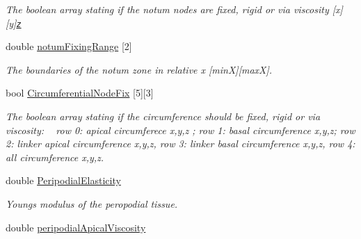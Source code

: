 \begin{DoxyCompactItemize}
\begin{DoxyCompactList}\small\item\em The boolean array stating if the notum nodes are fixed, rigid or via viscosity \mbox{[}x\mbox{]}\mbox{[}y\mbox{]}\href{accompanying boolean array to specify the fixing method Simulation#CircumferentialNodeFixWithHighExternalViscosity}{\tt z} \end{DoxyCompactList}\item 
\hypertarget{classSimulation_a995a48098144f291dfa47773c150ed84}{}double \hyperlink{classSimulation_a995a48098144f291dfa47773c150ed84}{notum\+Fixing\+Range} \mbox{[}2\mbox{]}\label{classSimulation_a995a48098144f291dfa47773c150ed84}

\begin{DoxyCompactList}\small\item\em The boundaries of the notum zone in relative x \mbox{[}min\+X\mbox{]}\mbox{[}max\+X\mbox{]}. \end{DoxyCompactList}\item 
\hypertarget{classSimulation_a42120f650198d83e054144ab71e2fee2}{}bool \hyperlink{classSimulation_a42120f650198d83e054144ab71e2fee2}{Circumferential\+Node\+Fix} \mbox{[}5\mbox{]}\mbox{[}3\mbox{]}\label{classSimulation_a42120f650198d83e054144ab71e2fee2}

\begin{DoxyCompactList}\small\item\em The boolean array stating if the circumference should be fixed, rigid or via viscosity\+: ~\newline
row 0\+: apical circumferece x,y,z ; row 1\+: basal circumference x,y,z; row 2\+: linker apical circumference x,y,z, row 3\+: linker basal circumference x,y,z, row 4\+: all circumference x,y,z. \end{DoxyCompactList}\item 
\hypertarget{classSimulation_a3d8435d5bedf3810cb12138538169d9c}{}double \hyperlink{classSimulation_a3d8435d5bedf3810cb12138538169d9c}{Peripodial\+Elasticity}\label{classSimulation_a3d8435d5bedf3810cb12138538169d9c}

\begin{DoxyCompactList}\small\item\em Young\textquotesingle{}s modulus of the peropodial tissue. \end{DoxyCompactList}\item 
\hypertarget{classSimulation_a9d12531ec1daffb9e389ac59b4f43299}{}double \hyperlink{classSimulation_a9d12531ec1daffb9e389ac59b4f43299}{peripodial\+Apical\+Viscosity}\label{classSimulation_a9d12531ec1daffb9e389ac59b4f43299}


\end{DoxyCompactItemize}
